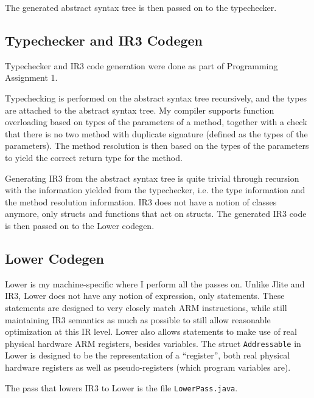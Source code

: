 \documentclass[nonacm, acmsmall, screen, 10pt]{acmart}
\begin{document}
The generated abstract syntax tree is then passed on to the typechecker.

\subsection{Typechecker and IR3 Codegen}
Typechecker and IR3 code generation were done as part of Programming Assignment 1.

Typechecking is performed on the abstract syntax tree recursively, and the types are attached to the abstract syntax tree.
My compiler supports function overloading based on types of the parameters of a method, together with a check that there is no two method with duplicate signature (defined as the types of the parameters).
The method resolution is then based on the types of the parameters to yield the correct return type for the method.

Generating IR3 from the abstract syntax tree is quite trivial through recursion with the information yielded from the typechecker, i.e. the type information and the method resolution information.
IR3 does not have a notion of classes anymore, only structs and functions that act on structs.
The generated IR3 code is then passed on to the Lower codegen.

\subsection{Lower Codegen}
Lower is my machine-specific where I perform all the passes on.
Unlike Jlite and IR3, Lower does not have any notion of expression, only statements.
These statements are designed to very closely match ARM instructions, while still maintaining IR3 semantics as much as possible to still allow reasonable optimization at this IR level.
Lower also allows statements to make use of real physical hardware ARM registers, besides variables.
The struct \texttt{Addressable} in Lower is designed to be the representation of a ``register'', both real physical hardware registers as well as pseudo-registers (which program variables are).

The pass that lowers IR3 to Lower is the file \texttt{LowerPass.java}.
\end{document}
